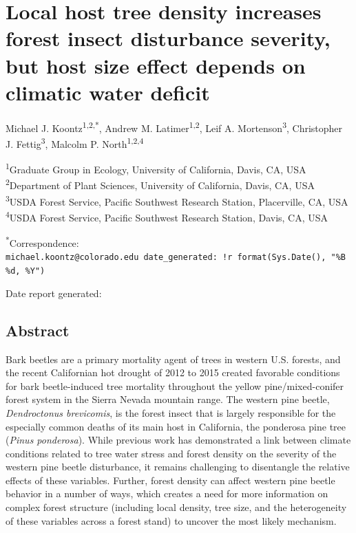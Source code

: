 \documentclass[]{article}
\title{}
\author{}
\date{}
\begin{document}
\section{Local host tree density increases forest insect disturbance
severity, but host size effect depends on climatic water
deficit}\label{local-host-tree-density-increases-forest-insect-disturbance-severity-but-host-size-effect-depends-on-climatic-water-deficit}

Michael J. Koontz\textsuperscript{1,2,*}, Andrew M.
Latimer\textsuperscript{1,2}, Leif A. Mortenson\textsuperscript{3},
Christopher J. Fettig\textsuperscript{3}, Malcolm P.
North\textsuperscript{1,2,4}

\textsuperscript{1}Graduate Group in Ecology, University of California,
Davis, CA, USA\\
\textsuperscript{2}Department of Plant Sciences, University of
California, Davis, CA, USA\\
\textsuperscript{3}USDA Forest Service, Pacific Southwest Research
Station, Placerville, CA, USA\\
\textsuperscript{4}USDA Forest Service, Pacific Southwest Research
Station, Davis, CA, USA

\textsuperscript{*}Correspondence:
\texttt{michael.koontz@colorado.edu\ date\_generated:\ !r\ format(Sys.Date(),\ "\%B\ \%d,\ \%Y")}

Date report generated:

\subsection{Abstract}\label{abstract}

Bark beetles are a primary mortality agent of trees in western U.S.
forests, and the recent Californian hot drought of 2012 to 2015 created
favorable conditions for bark beetle-induced tree mortality throughout
the yellow pine/mixed-conifer forest system in the Sierra Nevada
mountain range. The western pine beetle, \emph{Dendroctonus brevicomis},
is the forest insect that is largely responsible for the especially
common deaths of its main host in California, the ponderosa pine tree
(\emph{Pinus ponderosa}). While previous work has demonstrated a link
between climate conditions related to tree water stress and forest
density on the severity of the western pine beetle disturbance, it
remains challenging to disentangle the relative effects of these
variables. Further, forest density can affect western pine beetle
behavior in a number of ways, which creates a need for more information
on complex forest structure (including local density, tree size, and the
heterogeneity of these variables across a forest stand) to uncover the
most likely mechanism.
\end{document}
